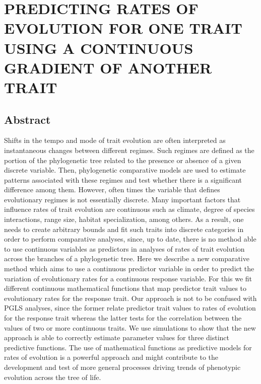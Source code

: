 
\chapter{PREDICTING RATES OF EVOLUTION FOR ONE TRAIT USING A CONTINUOUS GRADIENT OF ANOTHER TRAIT}

\section{Abstract}

Shifts in the tempo and mode of trait evolution are often interpreted as instantaneous changes between different regimes. Such regimes are defined as the portion of the phylogenetic tree related to the presence or absence of a given discrete variable. Then, phylogenetic comparative models are used to estimate patterns associated with these regimes and test whether there is a significant difference among them. However, often times the variable that defines evolutionary regimes is not essentially discrete. Many important factors that influence rates of trait evolution are continuous such as climate, degree of species interactions, range size, habitat specialization, among others. As a result, one needs to create arbitrary bounds and fit such traits into discrete categories in order to perform comparative analyses, since, up to date, there is no method able to use continuous variables as predictors in analyses of rates of trait evolution across the branches of a phylogenetic tree. Here we describe a new comparative method which aims to use a continuous predictor variable in order to predict the variation of evolutionary rates for a continuous response variable. For this we fit different continuous mathematical functions that map predictor trait values to evolutionary rates for the response trait. Our approach is not to be confused with PGLS analyses, since the former relate predictor trait values to rates of evolution for the response trait whereas the latter tests for the correlation between the values of two or more continuous traits. We use simulations to show that the new approach is able to correctly estimate parameter values for three distinct predictive functions. The use of mathematical functions as predictive models for rates of evolution is a powerful approach and might contribute to the development and test of more general processes driving trends of phenotypic evolution across the tree of life.

